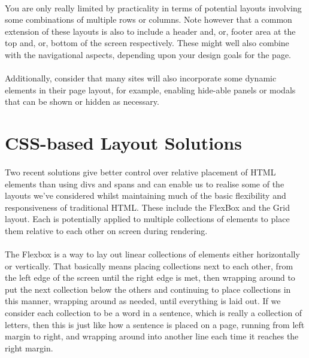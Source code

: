 \paragraph{} You are only really limited by practicality in terms of potential layouts involving some combinations of multiple rows or columns. Note however that a common extension of these layouts is also to include a header and, or, footer area at the top and, or, bottom of the screen respectively. These might well also combine with the navigational aspects, depending upon your design goals for the page.
\paragraph{} Additionally, consider that many sites will also incorporate some dynamic elements in their page layout, for example, enabling hide-able panels or modals that can be shown or hidden as necessary.



\section{CSS-based Layout Solutions}
\paragraph{} Two recent solutions give better control over relative placement of HTML elements than using divs and spans and can enable us to realise some of the layouts we've considered whilst maintaining much of the basic flexibility and responsiveness of traditional HTML. These include the FlexBox and the Grid layout. Each is potentially applied to multiple collections of elements to place them relative to each other on screen during rendering.
\paragraph{} The Flexbox is a way to lay out linear collections of elements either horizontally or vertically. That basically means placing collections next to each other, from the left edge of the screen until the right edge is met, then wrapping around to put the next collection below the others and continuing to place collections in this manner, wrapping around as needed, until everything is laid out. If we consider each collection to be a word in a sentence, which is really a collection of letters, then this is just like how a sentence is placed on a page, running from left margin to right, and wrapping around into another line each time it reaches the right margin.

